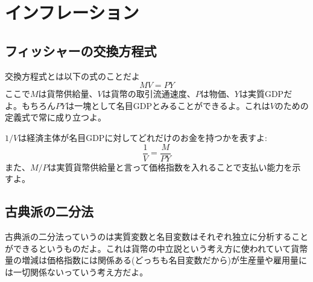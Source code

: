 \documentclass[a4paper, 12pt]{article}
\begin{document}
\section{インフレーション}
\subsection{フィッシャーの交換方程式}
交換方程式とは以下の式のことだよ
\begin{equation*}
  MV=PY
\end{equation*}
ここで$M$は貨幣供給量、$V$は貨幣の取引流通速度、$P$は物価、$Y$は実質GDPだよ。もちろん$PY$は一塊として名目GDPとみることができるよ。これは$V$のための定義式で常に成り立つよ。

$1/V$は経済主体が名目GDPに対してどれだけのお金を持つかを表すよ:
\begin{equation*}
  \frac{1}{V}=\frac{M}{PY}
\end{equation*}
また、$M/P$は実質貨幣供給量と言って価格指数を入れることで支払い能力を示すよ。
\subsection{古典派の二分法}
古典派の二分法っていうのは実質変数と名目変数はそれぞれ独立に分析することができるというものだよ。これは貨幣の中立説という考え方に使われていて貨幣量の増減は価格指数には関係ある(どっちも名目変数だから)が生産量や雇用量には一切関係ないっていう考え方だよ。
\end{document}
